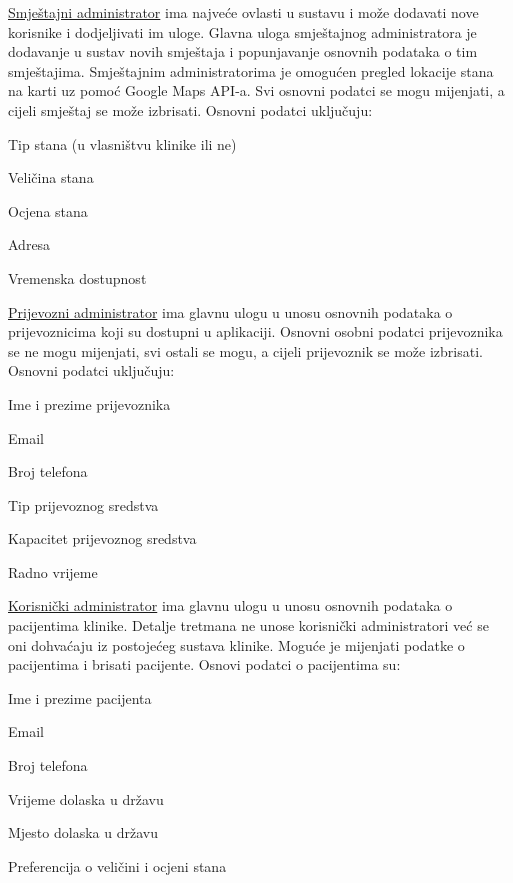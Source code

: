 		
		\underline{Smještajni administrator} ima najveće ovlasti u sustavu i može dodavati nove korisnike i dodjeljivati im uloge. Glavna uloga smještajnog administratora je dodavanje u sustav novih smještaja i popunjavanje osnovnih podataka o tim smještajima. Smještajnim administratorima je omogućen pregled lokacije stana na karti uz pomoć Google Maps API-a. Svi osnovni podatci se mogu mijenjati, a cijeli smještaj se može izbrisati. Osnovni podatci uključuju:
		\begin{packed_item}
			\item Tip stana (u vlasništvu klinike ili ne)
			\item Veličina stana
			\item Ocjena stana
			\item Adresa
			\item Vremenska dostupnost
		\end{packed_item}

		\underline{Prijevozni administrator} ima glavnu ulogu u unosu osnovnih podataka o prijevoznicima koji su dostupni u aplikaciji. Osnovni osobni podatci prijevoznika se ne mogu mijenjati, svi ostali se mogu, a cijeli prijevoznik se može izbrisati. Osnovni podatci uključuju:
		\begin{packed_item}
			\item Ime i prezime prijevoznika
			\item Email 
			\item Broj telefona
			\item Tip prijevoznog sredstva
			\item Kapacitet prijevoznog sredstva
			\item Radno vrijeme
		\end{packed_item}

		\underline{Korisnički administrator} ima glavnu ulogu u unosu osnovnih podataka o pacijentima klinike. Detalje tretmana ne unose korisnički administratori već se oni dohvaćaju iz postojećeg sustava klinike. Moguće je mijenjati podatke o pacijentima i brisati pacijente. Osnovi podatci o pacijentima su:
		\begin{packed_item}
			\item Ime i prezime pacijenta
			\item Email 
			\item Broj telefona
			\item Vrijeme dolaska u državu
			\item Mjesto dolaska u državu
			\item Preferencija o veličini i ocjeni stana 
		\end{packed_item}
		
